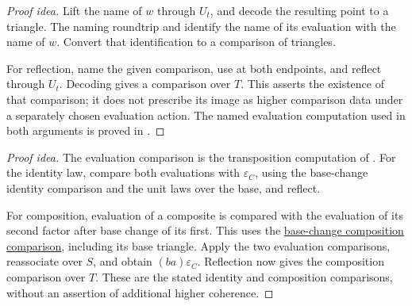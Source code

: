 \documentclass[11pt]{article}
\begin{document}
\begin{proof}[Proof idea]
Lift the name of $w$ through $U_t$, and decode the resulting point to a
triangle. The naming roundtrip and
 identify the name of its
evaluation with the name of $w$. Convert that identification to a comparison
of triangles.

For reflection, name the given comparison, use
 at both endpoints, and
reflect through $U_t$. Decoding gives a comparison over $T$.
This asserts the existence of that comparison; it does not prescribe its
image as higher comparison data under a separately chosen evaluation action.
The named evaluation computation used in both arguments is proved in
.
\end{proof}

\begin{proof}[Proof idea]
The evaluation comparison is the transposition computation of
. For the identity law,
compare both evaluations with $\varepsilon_C$, using the base-change
identity comparison and the unit laws over the base, and reflect.

For composition, evaluation of a composite is compared with the evaluation
of its second factor after base change of its first. This uses the
\href{supplementary-base-change-of-triangles.html}{base-change composition
comparison}, including its base triangle. Apply the two evaluation
comparisons, reassociate over $S$, and obtain $(ba)\varepsilon_C$.
Reflection now gives the composition comparison over $T$.
These are the stated identity and composition comparisons, without an
assertion of additional higher coherence.
\end{proof}
\end{document}
